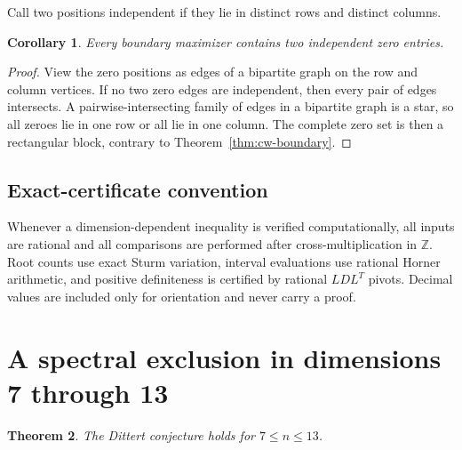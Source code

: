 \documentclass[10pt,a4paper]{amsart}
\newtheorem{theorem}{Theorem}[section]
\newtheorem{corollary}[theorem]{Corollary}
\theoremstyle{definition}
\theoremstyle{remark}
\begin{document}
Call two positions independent if they lie in distinct rows and distinct
columns.

\begin{corollary}\label{cor:two-independent-zeroes}
Every boundary maximizer contains two independent zero entries.
\end{corollary}

\begin{proof}
View the zero positions as edges of a bipartite graph on the row and column
vertices.  If no two zero edges are independent, then every pair of edges
intersects.  A pairwise-intersecting family of edges in a bipartite graph
is a star, so all zeroes lie in one row or all lie in one column.  The
complete zero set is then a rectangular block, contrary to
Theorem~\ref{thm:cw-boundary}.
\end{proof}

\subsection{Exact-certificate convention}

Whenever a dimension-dependent inequality is verified computationally, all
inputs are rational and all comparisons are performed after
cross-multiplication in \(\mathbb Z\).  Root counts use exact Sturm
variation, interval evaluations use rational Horner arithmetic, and
positive definiteness is certified by rational \(LDL^T\) pivots.  Decimal
values are included only for orientation and never carry a proof.

\section{A spectral exclusion in dimensions 7 through 13}\label{sec:spectral}

\begin{theorem}\label{thm:dittert-7-13}
The Dittert conjecture holds for \(7\leq n\leq13\).
\end{theorem}
\end{document}
